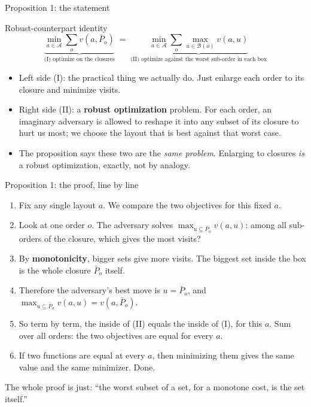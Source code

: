 \documentclass[11pt,aspectratio=169]{beamer}
\newcommand{\term}[1]{\textcolor{blue!60!black}{\textbf{#1}}}
\begin{document}
\begin{frame}{Proposition 1: the statement}
  \begin{block}{Robust-counterpart identity}
  \[
  \underbrace{\min_{a \in \mathcal A} \sum_{o} v(a, \bar P_o)}_{\text{(I) optimize on the closures}}
  \;=\;
  \underbrace{\min_{a \in \mathcal A} \sum_{o} \max_{u \in \mathcal B(o)} v(a, u)}_{\text{(II) optimize against the worst sub-order in each box}}
  \]
  \end{block}
  \begin{itemize}
    \item Left side (I): the practical thing we actually do. Just enlarge each order to its closure and minimize visits.
    \item Right side (II): a \term{robust optimization} problem. For each order, an imaginary adversary is allowed to reshape it into any subset of its closure to hurt us most; we choose the layout that is best against that worst case.
    \item The proposition says these two are the \emph{same problem}. Enlarging to closures \emph{is} a robust optimization, exactly, not by analogy.
  \end{itemize}
\end{frame}

\begin{frame}{Proposition 1: the proof, line by line}
  \begin{enumerate}
    \item Fix any single layout $a$. We compare the two objectives for this fixed $a$.
    \item Look at one order $o$. The adversary solves $\displaystyle\max_{u\subseteq \bar P_o} v(a,u)$: among all sub-orders of the closure, which gives the most visits?
    \item By \term{monotonicity}, bigger sets give more visits. The biggest set inside the box is the whole closure $\bar P_o$ itself.
    \item Therefore the adversary's best move is $u=\bar P_o$, and $\displaystyle\max_{u\subseteq \bar P_o} v(a,u) = v(a,\bar P_o)$.
    \item So term by term, the inside of (II) equals the inside of (I), for this $a$. Sum over all orders: the two objectives are equal for every $a$.
    \item If two functions are equal at every $a$, then minimizing them gives the same value and the same minimizer. Done.
  \end{enumerate}
  The whole proof is just: ``the worst subset of a set, for a monotone cost, is the set itself.''
\end{frame}
\end{document}

